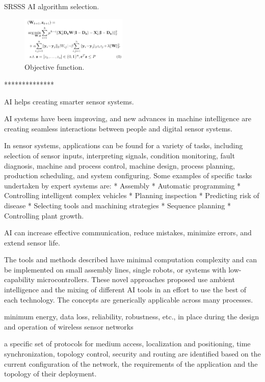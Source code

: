 SRSSS AI algorithm selection.

\begin{figure}[htbp]
	\centering
	\includegraphics[width=2in]{Figure/OF}
	\caption{Objective function.}
	\label{system}
\end{figure}


**************

AI helps creating smarter sensor systems.

AI systems have been improving, and new advances in machine intelligence are creating seamless interactions between people and digital sensor systems.

 In sensor systems, applications can be found for a variety of tasks, including selection of sensor inputs, interpreting signals, condition monitoring, fault diagnosis, machine and process control, machine design, process planning, production scheduling, and system configuring. Some examples of specific tasks undertaken by expert systems are:
* Assembly 
* Automatic programming 
* Controlling intelligent complex vehicles  
* Planning inspection 
* Predicting risk of disease 
* Selecting tools and machining strategies 
* Sequence planning 
* Controlling plant growth. 

AI can increase effective communication, reduce mistakes, minimize errors, and extend sensor life.



The tools and methods described have minimal computation complexity and can be implemented on small assembly lines, single robots, or systems with low-capability microcontrollers. These novel approaches proposed use ambient intelligence and the mixing of different AI tools in an effort to use the best of each technology. The concepts are generically applicable across many processes.


minimum energy, data loss, reliability, robustness, etc., in place during the design and operation of wireless sensor networks

a specific set of protocols for medium access, localization and positioning, time synchronization, topology control, security and routing are identified based on the current configuration of the network, the requirements of the application and the topology of their deployment.

